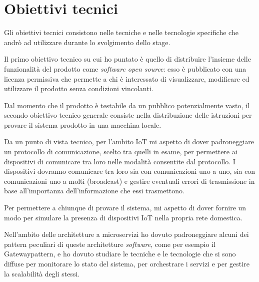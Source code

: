 \section{Obiettivi tecnici}

Gli obiettivi tecnici consistono nelle tecniche e nelle tecnologie specifiche che andrò ad utilizzare durante lo svolgimento dello stage.

Il primo obiettivo tecnico su cui ho puntato è quello di distribuire l'insieme delle funzionalità del prodotto come \emph{software open source}: esso è pubblicato con una licenza permissiva che permette a chi è interessato di visualizzare, modificare ed utilizzare il prodotto senza condizioni vincolanti.

Dal momento che il prodotto è testabile da un pubblico potenzialmente vasto, il secondo obiettivo tecnico generale consiste nella distribuzione delle istruzioni per provare il sistema prodotto in una macchina locale.

Da un punto di vista tecnico, per l'ambito IoT mi aspetto di dover padroneggiare un protocollo di comunicazione, scelto tra quelli in esame, per permettere ai dispositivi di comunicare tra loro nelle modalità consentite dal protocollo.
I dispositivi dovranno comunicare tra loro sia con comunicazioni uno a uno, sia con comunicazioni uno a molti (\gls{broadcast}) e gestire eventuali errori di trasmissione in base all'importanza dell'informazione che essi trasmettono.

Per permettere a chiunque di provare il sistema, mi aspetto di dover fornire un modo per simulare la presenza di dispositivi IoT nella propria rete domestica.

Nell'ambito delle architetture a microservizi ho dovuto padroneggiare alcuni dei \gls{pattern} peculiari di queste architetture \emph{software}, come per esempio il \gls{Gatewaypattern}, e ho dovuto studiare le tecniche e le tecnologie che si sono diffuse per monitorare lo stato del sistema, per orchestrare i servizi e per gestire la scalabilità degli stessi.
